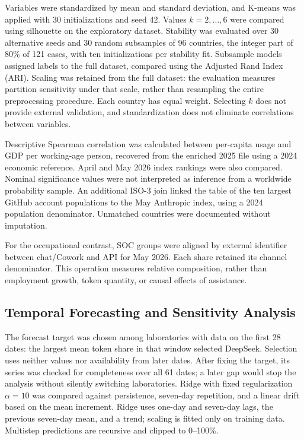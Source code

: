 \documentclass[11pt,a4paper]{article}
\begin{document}
Variables were standardized by mean and standard deviation, and K-means was applied with 30 initializations and seed 42. Values $k=2,\ldots,6$ were compared using silhouette on the exploratory dataset. Stability was evaluated over 30 alternative seeds and 30 random subsamples of 96 countries, the integer part of 80\% of 121 cases, with ten initializations per stability fit. Subsample models assigned labels to the full dataset, compared using the Adjusted Rand Index (ARI). Scaling was retained from the full dataset: the evaluation measures partition sensitivity under that scale, rather than resampling the entire preprocessing procedure. Each country has equal weight. Selecting $k$ does not provide external validation, and standardization does not eliminate correlations between variables.

Descriptive Spearman correlation was calculated between per-capita usage and GDP per working-age person, recovered from the enriched 2025 file using a 2024 economic reference. April and May 2026 index rankings were also compared. Nominal significance values were not interpreted as inference from a worldwide probability sample. An additional ISO-3 join linked the table of the ten largest GitHub account populations to the May Anthropic index, using a 2024 population denominator. Unmatched countries were documented without imputation.

For the occupational contrast, SOC groups were aligned by external identifier between chat/Cowork and API for May 2026. Each share retained its channel denominator. This operation measures relative composition, rather than employment growth, token quantity, or causal effects of assistance.

\subsection{Temporal Forecasting and Sensitivity Analysis}
The forecast target was chosen among laboratories with data on the first 28 dates: the largest mean token share in that window selected DeepSeek. Selection uses neither values nor availability from later dates. After fixing the target, its series was checked for completeness over all 61 dates; a later gap would stop the analysis without silently switching laboratories. Ridge with fixed regularization $\alpha=10$ was compared against persistence, seven-day repetition, and a linear drift based on the mean increment. Ridge uses one-day and seven-day lags, the previous seven-day mean, and a trend; scaling is fitted only on training data. Multistep predictions are recursive and clipped to 0--100\%.
\end{document}
